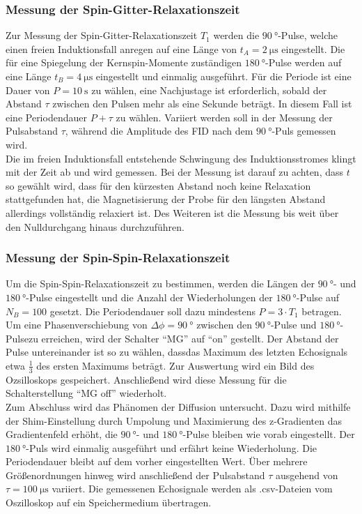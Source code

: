 \subsubsection{Messung der Spin-Gitter-Relaxationszeit}
Zur Messung der Spin-Gitter-Relaxationszeit $T_1$ werden die $\SI{90}{\degree}$-Pulse,
welche einen freien Induktionsfall anregen auf eine Länge von $t_A =
\SI{2}{\micro\second}$ eingestellt. Die für eine Spiegelung der Kernspin-Momente
zuständigen $\SI{180}{\degree}$-Pulse werden auf eine Länge $t_B =
\SI{4}{\micro\second}$ eingestellt und einmalig ausgeführt. Für die Periode ist eine
Dauer von $P = \SI{10}{\second}$ zu wählen, eine Nachjustage ist erforderlich,
sobald der Abstand $\tau$ zwischen den Pulsen mehr als eine Sekunde beträgt. In
diesem Fall ist eine Periodendauer $P + \tau$ zu wählen. Variiert werden soll in
der Messung der Pulsabstand $\tau$, während die Amplitude des FID nach dem
$\SI{90}{\degree}$-Puls gemessen wird. \\
\noindent Die im freien Induktionsfall entstehende Schwingung des
Induktionsstromes klingt mit der Zeit ab und wird gemessen. Bei der Messung ist
darauf zu achten, dass $t$ so gewählt wird, dass für den kürzesten Abstand
noch keine Relaxation stattgefunden hat, die Magnetisierung der Probe für den
längsten Abstand allerdings vollständig relaxiert ist. Des Weiteren ist die
Messung bis weit über den Nulldurchgang hinaus durchzuführen. \\
\subsubsection{Messung der Spin-Spin-Relaxationszeit}
\noindent Um die Spin-Spin-Relaxationszeit zu bestimmen, werden die Längen der
$\SI{90}{\degree}$- und $\SI{180}{\degree}$-Pulse eingestellt und die Anzahl der
Wiederholungen der $\SI{180}{\degree}$-Pulse auf
$N_B = 100$ gesetzt. Die Periodendauer soll dazu mindestens $P = 3 \cdot T_1$
betragen. Um eine Phasenverschiebung von $\Delta \phi = \SI{90}{\degree}$
zwischen den $\SI{90}{\degree}$-Pulse und $\SI{180}{\degree}$-Pulsezu erreichen,
wird der Schalter \enquote{MG} auf
\enquote{on} gestellt. Der Abstand der Pulse untereinander ist so zu wählen,
dassdas Maximum des letzten Echosignals etwa $\frac{1}{3}$ des ersten Maximums
beträgt. Zur Auswertung wird ein Bild des Ozsilloskops gespeichert. Anschließend
wird diese Messung für die Schalterstellung \enquote{MG off} wiederholt. \\
\noindent Zum Abschluss wird das Phänomen der Diffusion untersucht. Dazu wird
mithilfe der Shim-Einstellung durch Umpolung  und Maximierung des z-Gradienten
das Gradientenfeld erhöht, die $\SI{90}{\degree}$- und $\SI{180}{\degree}$-Pulse
bleiben wie vorab eingestellt. Der $\SI{180}{\degree}$-Puls wird einmalig ausgeführt und erfährt
keine Wiederholung. Die Periodendauer bleibt auf dem vorher eingestellten Wert.
Über mehrere Größenordnungen hinweg wird anschließend der Pulsabstand $\tau$
ausgehend von $\tau = \SI{100}{\micro\second}$ variiert. Die gemessenen Echosignale
werden als .csv-Dateien vom Oszilloskop auf ein Speichermedium übertragen.
